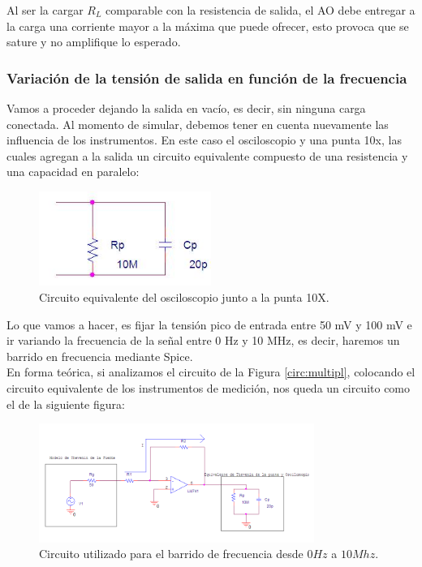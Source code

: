 Al ser la cargar $R_{L}$ comparable con la resistencia de salida, el AO debe entregar a la carga una corriente mayor a la máxima que puede ofrecer, esto provoca que se sature y no amplifique lo esperado.

\subsubsection{Variación de la tensión de salida en función de la frecuencia}
Vamos a proceder dejando la salida en vacío, es decir, sin ninguna carga conectada. Al momento de simular, debemos tener en cuenta nuevamente las influencia de los instrumentos. En este caso el osciloscopio y una punta 10x, las cuales agregan a la salida un circuito equivalente compuesto de una resistencia y una capacidad en paralelo:

\begin{figure}[H]
  \centering
      \includegraphics[width=0.5\textwidth]{gfx/puntax10.png}
  \caption{Circuito equivalente del osciloscopio junto a la punta 10X.}
\end{figure}

Lo que vamos a hacer, es fijar la tensión pico de entrada entre 50 mV y 100 mV e ir variando la frecuencia de la señal entre 0 Hz y 10 MHz, es decir, haremos un barrido en frecuencia mediante Spice.\\
En forma teórica, si analizamos el circuito de la Figura \ref{circ:multipl}, colocando el circuito equivalente de los instrumentos de medición, nos queda un circuito como el de la siguiente figura:

\begin{figure}[H]
  \centering
      \includegraphics[width=0.8\textwidth]{gfxhernan/FIG28modif.PNG}
  \caption{Circuito utilizado para el barrido de frecuencia desde $0Hz$ a $10Mhz$.}
\end{figure}

